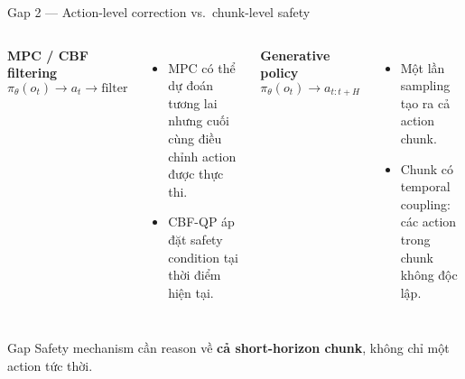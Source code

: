 \documentclass[aspectratio=169]{beamer}
\begin{document}
\begin{frame}[t,shrink=8]{Gap 2 --- Action-level correction vs.\ chunk-level safety}
\begin{columns}[T]

\textbf{MPC / CBF filtering}
\[
\pi_\theta(o_t)
\rightarrow
\boxed{a_t}
\rightarrow
\text{filter}
\]
\begin{itemize}
    \item MPC có thể dự đoán tương lai nhưng cuối cùng điều chỉnh
    action được thực thi.
    
    \item CBF-QP áp đặt safety condition tại thời điểm hiện tại.
\end{itemize}

\textbf{Generative policy}
\[
\pi_\theta(o_t)
\rightarrow
\boxed{
a_{t:t+H}
}
\]
\begin{itemize}
    \item Một lần sampling tạo ra cả action chunk.
    \item Chunk có temporal coupling: các action trong chunk không độc lập.
\end{itemize}

\end{columns}
\vspace{6pt}

\begin{alertblock}{Gap}
Safety mechanism cần reason về \textbf{cả short-horizon chunk},
không chỉ một action tức thời.
\end{alertblock}
\end{frame}

\end{document}
